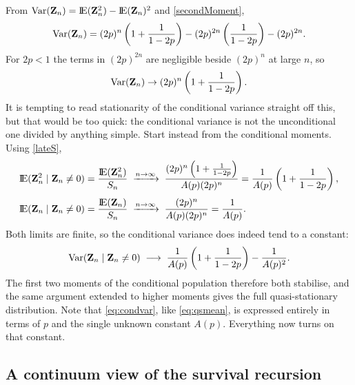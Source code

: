 From $\text{Var}({\bf Z}_n) = {\rm I}\!{\rm E}({\bf Z}_n^2)-{\rm I}\!{\rm E}({\bf Z}_n)^2$ and \cref{secondMoment},
\begin{equation*}
\text{Var}({\bf Z}_n) = (2p)^n\left(1 + \frac{1}{1-2p}\right) - (2p)^{2n}\left(\frac{1}{1-2p}\right) - (2p)^{2n}.
\end{equation*}
For $2p<1$ the terms in $(2p)^{2n}$ are negligible beside $(2p)^n$ at large $n$, so
\begin{equation*}
\text{Var}({\bf Z}_n) \to (2p)^n\left(1 + \frac{1}{1-2p}\right).
\end{equation*}
It is tempting to read stationarity of the conditional variance straight off this, but
that would be too quick: the conditional variance is not the unconditional one divided
by anything simple. Start instead from the conditional moments. Using \cref{lateS},
\begin{align*}
{\rm I}\!{\rm E}({\bf Z}_n^2\mid {\bf Z}_n\neq0) &= \frac{{\rm I}\!{\rm E}({\bf Z}_n^2)}{S_n}
\;\xrightarrow{n\to\infty}\;
\frac{(2p)^n\left(1+\frac{1}{1-2p}\right)}{A(p)(2p)^n} = \frac{1}{A(p)}\left(1+\frac{1}{1-2p}\right),\\[4pt]
{\rm I}\!{\rm E}({\bf Z}_n\mid {\bf Z}_n\neq0) &= \frac{{\rm I}\!{\rm E}({\bf Z}_n)}{S_n}
\;\xrightarrow{n\to\infty}\;
\frac{(2p)^n}{A(p)(2p)^n} = \frac{1}{A(p)}.
\end{align*}
Both limits are finite, so the conditional variance does indeed tend to a constant:
\begin{equation}
\label{eq:condvar}
\text{Var}({\bf Z}_n\mid {\bf Z}_n\neq0) \;\longrightarrow\; \frac{1}{A(p)}\left(1+\frac{1}{1-2p}\right) - \frac{1}{A(p)^2}.
\end{equation}
The first two moments of the conditional population therefore both stabilise, and the
same argument extended to higher moments gives the full quasi-stationary distribution.
Note that \cref{eq:condvar}, like \cref{eq:qsmean}, is expressed entirely in terms of
$p$ and the single unknown constant $A(p)$. Everything now turns on that constant.

\subsection{A continuum view of the survival recursion}
\label{sec:riccati}

